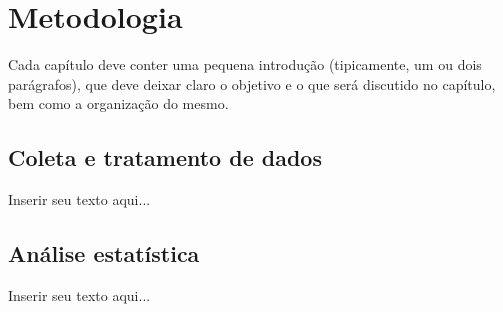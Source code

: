 
\chapter{Metodologia}
\label{chap_metodologia}
Cada capítulo deve conter uma pequena introdução (tipicamente, um ou dois parágrafos), que deve deixar claro o objetivo e o que será discutido no capítulo, bem como a organização do mesmo.

\section{Coleta e tratamento de dados}
\label{sec_coleta_e_tratamento_de_dados}

Inserir seu texto aqui...

\section{Análise estatística}
\label{sec_analise_estatistica}

Inserir seu texto aqui...
